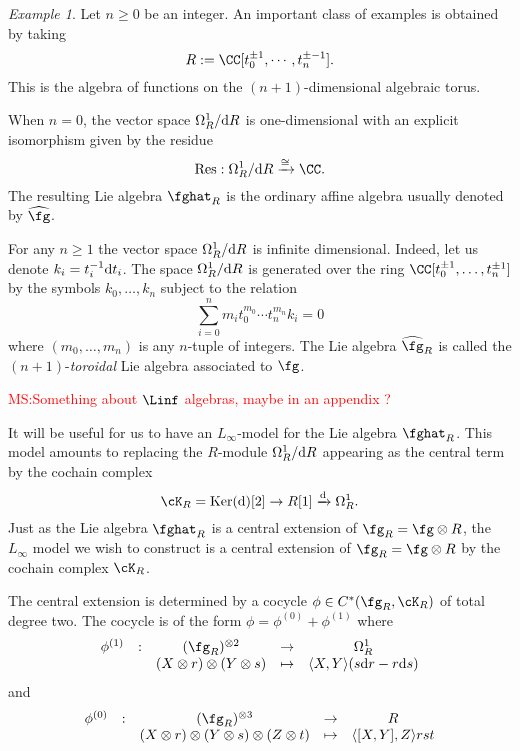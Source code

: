 \documentclass[12pt]{amsart}
\theoremstyle{definition}
\theoremstyle{remark}
\newtheorem{eg}[theorem]{Example}
\DeclareMathOperator{\Ker}{Ker}
\def\d{{\rm d}}
\def\tensor{\otimes}
\def\Hat{\widehat}
\def\xto{\xrightarrow}
\def\matt{\textcolor{red}{MS:}\textcolor{red}}
\begin{document}
\begin{eg}

Let $n \geq 0$ be an integer.
An important class of examples is obtained by taking
\[
R := \CC[t^{\pm 1}_0, \cdots, t^{\pm -1}_n] .
\]
This is the algebra of functions on the $(n+1)$-dimensional algebraic torus. 

When $n=0$, the vector space $\Omega^1_R / \d R$ is one-dimensional with an explicit isomorphism given by the residue
\[
{\rm Res} : \Omega^1_R / \d R \xto{\cong} \CC . 
\]
The resulting Lie algebra $\fghat_R$ is the ordinary affine algebra usually denoted by $\Hat{\fg}$. 
 
For any $n \geq 1$ the vector space $\Omega^{1}_R / \d R$ is infinite dimensional. 
Indeed, let us denote $k_i = t_i^{-1} \d t_i$. 
The space $\Omega^1_{R} / \d R$ is generated over the ring $\CC[t_0^{\pm 1}, \ldots, t_n^{\pm 1}]$ by the symbols $k_0,\ldots, k_n$ subject to the relation
\[
\sum_{i = 0}^n m_i t_0^{m_0} \cdots t_n^{m_n} k_i = 0
\]
where $(m_0,\ldots, m_n)$ is any $n$-tuple of integers.
The Lie algebra $\Hat{\fg}_R$ is called the $(n+1)$-{\em toroidal} Lie algebra associated to $\fg$.

\end{eg}

\matt{Something about $\Linf$ algebras, maybe in an appendix ?}

It will be useful for us to have an $L_\infty$-model for the Lie algebra $\fghat_{R}$. 
This model amounts to replacing the $R$-module $\Omega^1_R / \d R$ appearing as the central term by the cochain complex
\[
\cK_{R} = \Ker (\d) [2] \to R[1] \xto{\d} \Omega^{1}_{R} .
\]
Just as the Lie algebra $\fghat_R$ is a central extension of $\fg_R = \fg \tensor R$, the $L_\infty$ model we wish to construct is a central extension of $\fg_R = \fg \tensor R$ by the cochain complex $\cK_R$. 
 
The central extension is determined by a cocycle $\phi \in C^*(\fg_R, \cK_R)$ of total degree two.
The cocycle is of the form $\phi = \phi^{(0)} + \phi^{(1)}$ where
\[
\begin{array}{ccccc}
\phi^{(1)} & : & (\fg_{R})^{\otimes 2} & \rightarrow & \Omega^1_{R} \\
& & (X \otimes r) \otimes (Y \otimes s) & \mapsto & \langle X, Y \rangle (s \d r - r \d s)
\end{array}
\]
and 
\[
\begin{array}{ccccc}
\phi^{(0)} & : & (\fg_{R})^{\otimes 3} & \rightarrow & R \\
& & (X \otimes r)\otimes(Y \otimes s) \otimes (Z \otimes t) & \mapsto &\langle [X,Y], Z \rangle rst
\end{array}
\]
\end{document}
